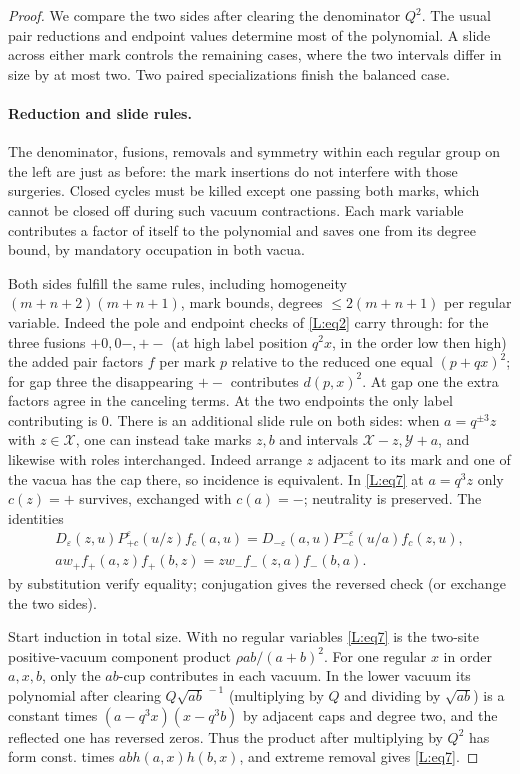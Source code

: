 \begin{proof}
We compare the two sides after clearing the denominator $Q^2$.
The usual pair reductions and endpoint values determine most of the
polynomial. A slide across either mark controls the remaining cases,
where the two intervals differ in size by at most two. Two paired
specializations finish the balanced case.

\paragraph{Reduction and slide rules.} The denominator, fusions, removals and symmetry within each regular group on the left are just as before: the mark insertions do not interfere with those surgeries. Closed cycles must be killed except one passing both marks, which cannot be closed off during such vacuum contractions. Each mark variable contributes a factor of itself to the polynomial and saves one from its degree bound, by mandatory occupation in both vacua.

Both sides fulfill the same rules, including homogeneity \((m+n+2)(m+n+1)\), mark bounds, degrees \(\le2(m+n+1)\) per regular variable. Indeed the pole and endpoint checks of \eqref{L:eq2} carry through: for the three fusions \(+0,0-,+-\) (at high label position \(q^2x\), in the order low then high) the added pair factors \(f\) per mark \(p\) relative to the reduced one equal \((p+qx)^2\); for gap three the disappearing \(+-\) contributes \(d(p,x)^2\). At gap one the extra factors agree in the canceling terms. At the two endpoints the only label contributing is 0. There is an additional slide rule on both sides: when \(a=q^{\pm3} z\) with \(z\in\mathcal X\), one can instead take marks \(z,b\) and intervals \(\mathcal X-z,\mathcal Y+a\), and likewise with roles interchanged. Indeed arrange \(z\) adjacent to its mark and one of the vacua has the cap there, so incidence is equivalent. In \eqref{L:eq7} at \(a=q^3z\) only \(c(z)=+\) survives, exchanged with \(c(a)=-\); neutrality is preserved. The identities
\[
\begin{gathered}
 D_\varepsilon(z,u)P^\varepsilon_{+c}(u/z) f_c(a,u)
 =D_{-\varepsilon}(a,u)P^{-\varepsilon}_{-c}(u/a) f_c(z,u),\\
 a w_+ f_+(a,z) f_+(b,z)= z w_- f_-(z,a) f_-(b,a).
\end{gathered}
\]
by substitution verify equality; conjugation gives the reversed check (or exchange the two sides).



Start induction in total size. With no regular variables \eqref{L:eq7} is the two-site positive-vacuum component product \(\rho ab/(a+b)^2\). For one regular \(x\) in order \(a,x,b\), only the \(ab\)-cup contributes in each vacuum. In the lower vacuum its polynomial after clearing \(Q\sqrt{ab}^{\,-1}\) (multiplying by \(Q\) and dividing by \(\sqrt{ab}\)) is a constant times \((a-q^3x)(x-q^3 b)\) by adjacent caps and degree two, and the reflected one has reversed zeros. Thus the product after multiplying by \(Q^2\) has form const. times \(ab h(a,x)h(b,x)\), and extreme removal gives \eqref{L:eq7}.


\end{proof}
